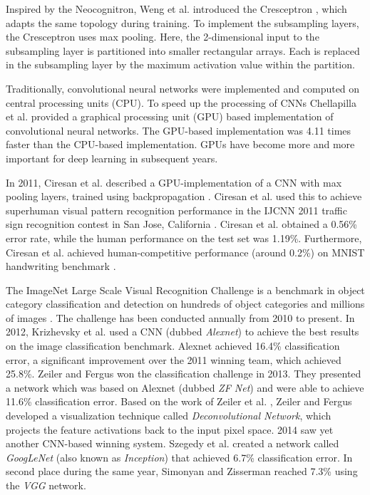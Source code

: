 Inspired by the Neocognitron, Weng et al. introduced the Cresceptron \cite{weng1992cresceptron}, which adapts the same topology during training. To implement the subsampling layers, the Cresceptron uses max pooling. Here, the 2-dimensional input to the subsampling layer is partitioned into smaller rectangular arrays. Each is replaced in the subsampling layer by the maximum activation value within the partition.

Traditionally, convolutional neural networks were implemented and computed on central processing units (CPU). To speed up the processing of CNNs Chellapilla et al. provided a graphical processing unit (GPU) based implementation of convolutional neural networks\cite{chellapilla2006high}. The GPU-based implementation was 4.11 times faster than the CPU-based implementation. GPUs have become more and more important for deep learning in subsequent years.

In 2011, Ciresan et al. \cite{ciresan2011flexible} described a GPU-implementation \cite{chellapilla2006high} of a CNN with max pooling layers\cite{weng1992cresceptron}, trained using backpropagation \cite{lecun1989backpropagation}. Ciresan et al. used this to achieve superhuman visual pattern recognition performance in the IJCNN 2011 traffic sign recognition contest in San Jose, California \cite{stallkamp2011german} \cite{cirecsan2011committee} \cite{cirecsan2012multitraffic}. Ciresan et al. obtained a 0.56\% error rate, while the human performance on the test set was 1.19\%. Furthermore, Ciresan et al. achieved human-competitive performance (around 0.2\%) on MNIST handwriting benchmark \cite{cirecsan2012multimnist}.

The ImageNet Large Scale Visual Recognition Challenge is a benchmark in object category classification and detection on hundreds of object categories and millions of images \cite{ILSVRC15}. The challenge has been conducted annually from 2010 to present. In 2012, Krizhevsky et al. \cite{krizhevsky2012imagenet} used a CNN (dubbed \textit{Alexnet}) to achieve the best results on the image classification benchmark. Alexnet achieved 16.4\% classification error, a significant improvement over the 2011 winning team, which achieved 25.8\%. Zeiler and Fergus \cite{zeiler2014visualizing} won the classification challenge in 2013. They presented a network which was based on Alexnet (dubbed \textit{ZF Net}) and were able to achieve 11.6\% classification error. Based on the work of Zeiler et al. \cite{zeiler2011adaptive}, Zeiler and Fergus developed a visualization technique called \textit{Deconvolutional Network}, which projects the feature activations back to the input pixel space. 2014 saw yet another CNN-based winning system. Szegedy et al. \cite{szegedy2015going} created a network called \textit{GoogLeNet} (also known as \textit{Inception}) that achieved 6.7\% classification error. In second place during the same year, Simonyan and Zisserman \cite{simonyan2014very} reached 7.3\% using the \textit{VGG} network.


